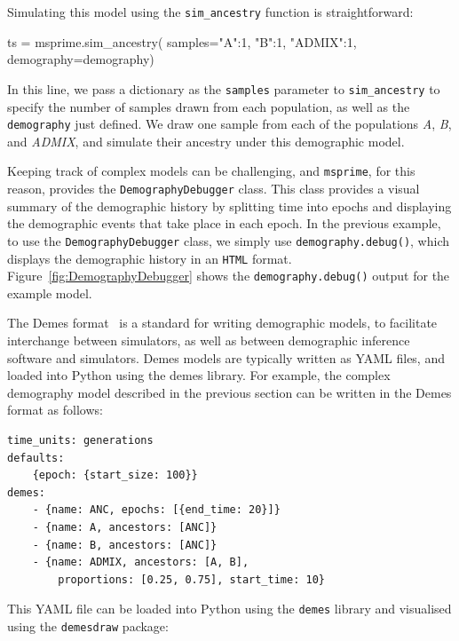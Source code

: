 \documentclass[graybox]{svmult}
\newcommand{\msprime}[0]{\texttt{msprime}}
\begin{document}
Simulating this model using the \texttt{sim\_ancestry} function is straightforward:
\begin{pythoncode}
ts = msprime.sim_ancestry(
    samples={"A":1, "B":1, "ADMIX":1}, demography=demography)
\end{pythoncode}
In this line, we pass a dictionary as the \texttt{samples} parameter to \texttt{sim\_ancestry} to
specify the number of samples drawn from each population, as well as the
\texttt{demography} just defined.
We draw one sample from each of the populations
\emph{A}, \emph{B}, and \emph{ADMIX}, and simulate their ancestry under this
demographic model.


\label{demography-debugger}
Keeping track of complex models can be challenging, and \msprime, for this reason,
provides the \texttt{DemographyDebugger} class. This class provides a visual summary of
the demographic history by splitting time into epochs and displaying the demographic
events that take place in each epoch. In the previous example, to use the \texttt{DemographyDebugger} class,
we simply use \texttt{demography.debug()}, which displays the demographic history in an \texttt{HTML}
format. Figure~\ref{fig:DemographyDebugger} shows the \texttt{demography.debug()} output
for the example model.

The Demes format~\citep{gower2022demes} is a standard for writing
demographic models, to facilitate interchange between simulators, as well as between
demographic inference software and simulators. Demes models are typically written as
YAML files, and loaded into Python using the demes library.
For example, the complex demography model described in the previous section can be
written in the Demes format as follows:

\begin{footnotesize}
\begin{verbatim}
time_units: generations
defaults:
    {epoch: {start_size: 100}}
demes:
    - {name: ANC, epochs: [{end_time: 20}]}
    - {name: A, ancestors: [ANC]}
    - {name: B, ancestors: [ANC]}
    - {name: ADMIX, ancestors: [A, B],
        proportions: [0.25, 0.75], start_time: 10}
\end{verbatim}
\end{footnotesize}

This YAML file can be loaded into Python using the \texttt{demes} library and 
visualised using the \texttt{demesdraw} package:
\end{document}
